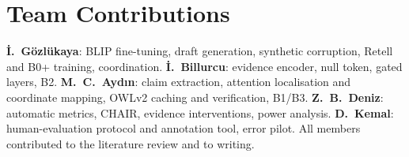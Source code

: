 \documentclass[conference]{IEEEtran}
\begin{document}
\section*{Team Contributions}
\textbf{\.{I}.~G\"{o}zl\"{u}kaya}: BLIP fine-tuning, draft generation, synthetic corruption, Retell and B0+ training, coordination.
\textbf{\.{I}.~Billurcu}: evidence encoder, null token, gated layers, B2.
\textbf{M.~C.~Ayd\i{}n}: claim extraction, attention localisation and coordinate mapping, OWLv2 caching and verification, B1/B3.
\textbf{Z.~B.~Deniz}: automatic metrics, CHAIR, evidence interventions, power analysis.
\textbf{D.~Kemal}: human-evaluation protocol and annotation tool, error pilot.
All members contributed to the literature review and to writing.



\end{document}
